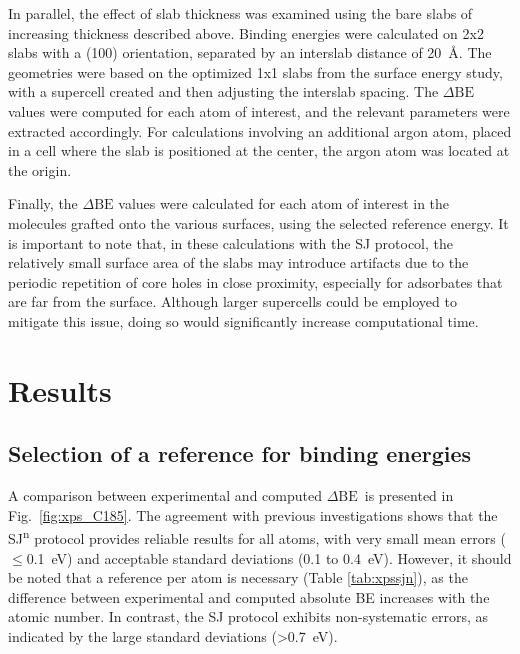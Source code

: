 \documentclass[journal=jpccck,manuscript=article]{achemso}
\def\dbe{\ensuremath{\Delta\text{BE}}}
\begin{document}
In parallel, the effect of slab thickness was examined using the bare slabs of increasing thickness described above. Binding energies were calculated on 2x2 slabs with a (100) orientation, separated by an interslab distance of \SI{20}{\angstrom}. The geometries were based on the optimized 1x1 slabs from the surface energy study, with a supercell created and then adjusting the interslab spacing. The \dbe{} values were computed for each atom of interest, and the relevant parameters were extracted accordingly. For calculations involving an additional argon atom, placed in a cell where the slab is positioned at the center, the argon atom was located at the origin.

Finally, the \dbe{} values were calculated for each atom of interest in the molecules grafted onto the various surfaces, using the selected reference energy. It is important to note that, in these calculations with the SJ protocol, the relatively small surface area of the slabs may introduce artifacts due to the periodic repetition of core holes in close proximity, especially for adsorbates that are far from the surface\cite{taucherFinalStateSimulationsCoreLevel2020}. Although larger supercells could be employed to mitigate this issue, doing so would significantly increase computational time.



\section{Results}

\subsection{Selection of a reference for binding energies}

A comparison between experimental and computed \dbe\ is presented in Fig.~\ref{fig:xps_C185}. The agreement with previous investigations \cite{pueyobellafontPredictingCoreLevel2017,golzeAccurateAbsoluteRelative2020} shows that the SJ\textsuperscript{n} protocol provides reliable results for all atoms, with very small mean errors ($\leq$\SI{0.1}{\electronvolt}) and acceptable standard deviations (0.1 to \SI{0.4}{\electronvolt}). However, it should be noted that a reference per atom is necessary (Table \ref{tab:xpssjn}), as the difference between experimental and computed absolute BE increases with the atomic number. 
In contrast, the SJ protocol exhibits non-systematic errors, as indicated by the large standard deviations (>\SI{0.7}{\electronvolt}).
\end{document}
